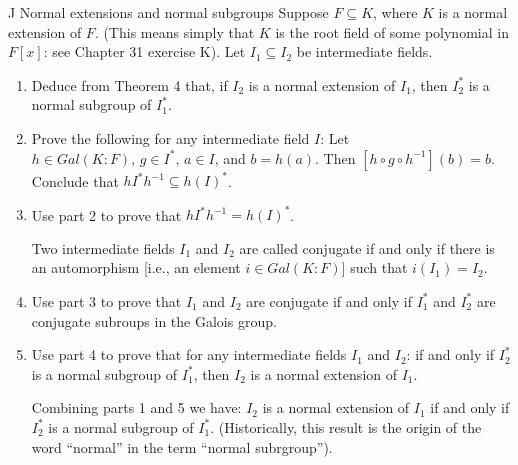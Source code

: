 \begin{exercise}{J Normal extensions and normal subgroups}
Suppose $F\subseteq K$, where $K$ is a normal extension of $F$. (This means simply that $K$ is the root field of some polynomial in $F[x]$: see Chapter 31 exercise K). Let $I_1\subseteq I_2$ be intermediate fields.
\begin{enumerate}
    \item Deduce from Theorem 4 that, if $I_2$ is a normal extension of $I_1$, then $I^\ast_2$ is a normal subgroup of $I^\ast_1$.
    \item Prove the following for any intermediate field $I$: Let ${h\in Gal(K:F)},\, g\in I^\ast,\, a\in I$, and $b=h(a)$. Then $[h\circ g\circ h^{-1}](b)=b$. Conclude that $hI^\ast h^{-1}\subseteq h(I)^\ast$.
    \item Use part 2 to prove that $hI^\ast h^{-1}=h(I)^\ast$.

    Two intermediate fields $I_1$ and $I_2$ are called conjugate if and only if there is an automorphism [i.e., an element $i\in Gal(K:F)$] such that $i(I_1)=I_2$.
    \item Use part 3 to prove that $I_1$ and $I_2$ are conjugate if and only if $I^\ast_1$ and $I^\ast_2$ are conjugate subroups in the Galois group.
    \item Use part 4 to prove that for any intermediate fields $I_1$ and $I_2$: if and only if $I^\ast_2$ is a normal subgroup of $I^\ast_1$, then $I_2$ is a normal extension of $I_1$.

    Combining parts 1 and 5 we have: $I_2$ is a normal extension of $I_1$ if and only if $I^\ast_2$ is a normal subgroup of $I^\ast_1$. (Historically, this result is the origin of the word ``normal'' in the term ``normal subrgroup'').
\end{enumerate}
\end{exercise}
